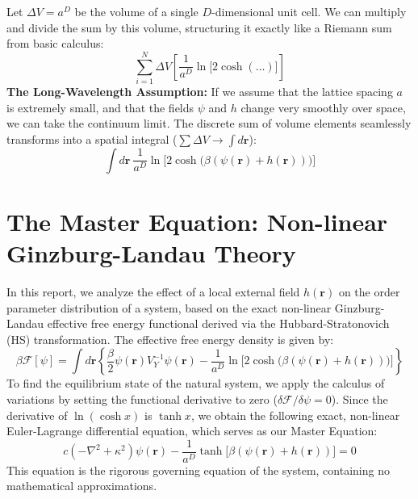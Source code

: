 \documentclass[12pt,a4paper]{article}
\begin{document}
Let $\Delta V = a^D$ be the volume of a single $D$-dimensional unit cell. We can multiply and divide the sum by this volume, structuring it exactly like a Riemann sum from basic calculus:
\begin{equation}
    \sum_{i=1}^N \Delta V \left[ \frac{1}{a^D} \ln\big[2\cosh(\dots)\big] \right]
\end{equation}
\textbf{The Long-Wavelength Assumption:} If we assume that the lattice spacing $a$ is extremely small, and that the fields $\psi$ and $h$ change very smoothly over space, we can take the continuum limit. The discrete sum of volume elements seamlessly transforms into a spatial integral ($\sum \Delta V \to \int d\mathbf{r}$):
\begin{equation}
    \int d\mathbf{r} \ \frac{1}{a^D} \ln \Big[ 2\cosh\big(\beta(\psi(\mathbf{r}) + h(\mathbf{r}))\big) \Big]
\end{equation}


\section{The Master Equation: Non-linear Ginzburg-Landau Theory}
In this report, we analyze the effect of a local external field $h(\mathbf{r})$ on the order parameter distribution of a system, based on the exact non-linear Ginzburg-Landau effective free energy functional derived via the Hubbard-Stratonovich (HS) transformation. The effective free energy density is given by:
\begin{equation}
    \beta \mathcal{F}[\psi] = \int d\mathbf{r} \left\{ \frac{\beta}{2} \psi(\mathbf{r}) V_Y^{-1} \psi(\mathbf{r}) - \frac{1}{a^D} \ln \Big[ 2\cosh\big(\beta(\psi(\mathbf{r}) + h(\mathbf{r}))\big) \Big] \right\}
\end{equation}
To find the equilibrium state of the natural system, we apply the calculus of variations by setting the functional derivative to zero ($\delta \mathcal{F}/\delta \psi = 0$). Since the derivative of $\ln(\cosh x)$ is $\tanh x$, we obtain the following exact, non-linear Euler-Lagrange differential equation, which serves as our Master Equation:
\begin{equation}
    c(-\nabla^2 + \kappa^2)\psi(\mathbf{r}) - \frac{1}{a^D} \tanh\big[\beta(\psi(\mathbf{r}) + h(\mathbf{r}))\big] = 0
\end{equation}
This equation is the rigorous governing equation of the system, containing no mathematical approximations.
\end{document}
